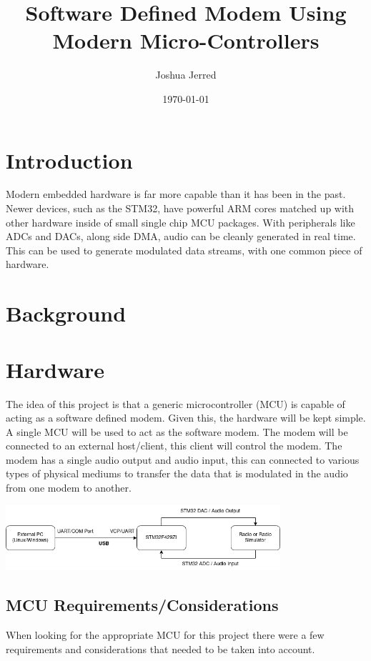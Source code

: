 \documentclass{journal}
\title{Software Defined Modem Using Modern Micro-Controllers}
\author{Joshua Jerred}
\date{\today}
\begin{document}
\maketitle

\section{Introduction}

Modern embedded hardware is far more capable than it has been in the past. Newer devices, such as the STM32, have powerful ARM cores matched up with other hardware inside of small single chip MCU packages. With peripherals like ADCs and DACs, along side DMA, audio can be cleanly generated in real time. This can be used to generate modulated data streams, with one common piece of hardware.

\section{Background}

\section{Hardware}
The idea of this project is that a generic microcontroller (MCU) is capable of acting as a software defined modem. Given this, the hardware will be kept simple. A single MCU will be used to act as the software modem. The modem will be connected to an external host/client, this client will control the modem. The modem has a single audio output and audio input, this can connected to various types of physical mediums to transfer the data that is modulated in the audio from one modem to another.

\includegraphics[width=4in]{images/hardware_outline}

\begin{center}
\subsection{MCU Requirements/Considerations}
\end{center}

When looking for the appropriate MCU for this project there were a few requirements and considerations that needed to be taken into account.
\end{document}
